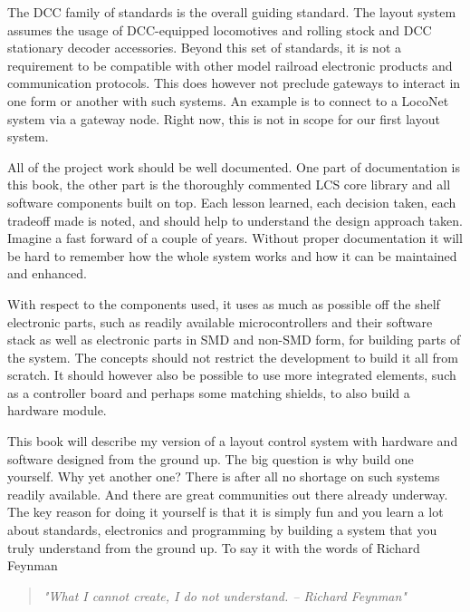 
The DCC family of standards is the overall guiding standard. The layout system assumes the usage of DCC-equipped locomotives and rolling stock and DCC stationary decoder accessories. Beyond this set of standards, it is not a requirement to be compatible with other model railroad electronic products and communication protocols. This does however not preclude gateways to interact in one form or another with such systems. An example is to connect to a LocoNet system via a gateway node. Right now, this is not in scope for our first layout system.

All of the project work should be well documented. One part of documentation is this book, the other part is the thoroughly commented LCS core library and all software components built on top. Each lesson learned, each decision taken, each tradeoff made is noted, and should help to understand the design approach taken. Imagine a fast forward of a couple of years. Without proper documentation it will be hard to remember how the whole system works and how it can be maintained and enhanced.

With respect to the components used, it uses as much as possible off the shelf electronic parts, such as readily available microcontrollers and their software stack as well as electronic parts in SMD and non-SMD form, for building parts of the system. The concepts should not restrict the development to build it all from scratch. It should however also be possible to use more integrated elements, such as a controller board and perhaps some matching shields, to also build a hardware module.


This book will describe my version of a layout control system with hardware and software designed from the ground up. The big question is why build one yourself. Why yet another one? There is after all no shortage on such systems readily available. And there are great communities out there already underway. The key reason for doing it yourself is that it is simply fun and you learn a lot about standards, electronics and programming by building a system that you truly understand from the ground up. To say it with the words of Richard Feynman

\begin{quotation}
    \textit{ "What I cannot create, I do not understand. -- Richard Feynman"}
\end{quotation}

